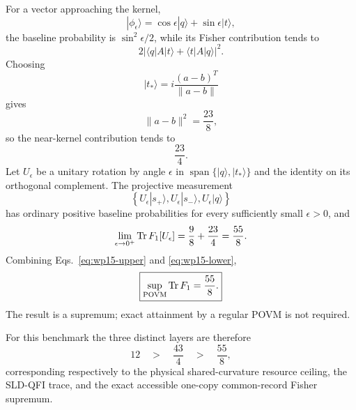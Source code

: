 For a vector approaching the kernel,
\begin{equation}
|\phi_\epsilon\rangle
=\cos\epsilon|q\rangle+\sin\epsilon|t\rangle,
\end{equation}
the baseline probability is $\sin^2\epsilon/2$, while its Fisher contribution tends to
\begin{equation}
2|\langle q|A|t\rangle+\langle t|A|q\rangle|^2.
\end{equation}
Choosing
\begin{equation}
|t_*\rangle=i\frac{(a-b)^T}{\|a-b\|}
\end{equation}
gives
\begin{equation}
\|a-b\|^2=\frac{23}{8},
\end{equation}
so the near-kernel contribution tends to
\begin{equation}
\frac{23}{4}.
\end{equation}
Let $U_\epsilon$ be a unitary rotation by angle $\epsilon$ in $\operatorname{span}\{|q\rangle,|t_*\rangle\}$ and the identity on its orthogonal complement. The projective measurement
\begin{equation}
\left\{
U_\epsilon|s_+\rangle,
U_\epsilon|s_-\rangle,
U_\epsilon|q\rangle
\right\}
\end{equation}
has ordinary positive baseline probabilities for every sufficiently small $\epsilon>0$, and
\begin{equation}
\lim_{\epsilon\to0^+}\operatorname{Tr} F_1[U_\epsilon]
=\frac98+\frac{23}{4}
=\frac{55}{8}.
\label{eq:wp15-lower}
\end{equation}
Combining Eqs.~\eqref{eq:wp15-upper} and \eqref{eq:wp15-lower},
\begin{equation}
\boxed{
\sup_{\mathrm{POVM}}\operatorname{Tr} F_1=\frac{55}{8}.
}
\end{equation}
The result is a supremum; exact attainment by a regular POVM is not required.

For this benchmark the three distinct layers are therefore
\begin{equation}
12\quad>\quad\frac{43}{4}\quad>\quad\frac{55}{8},
\end{equation}
corresponding respectively to the physical shared-curvature resource ceiling, the SLD-QFI trace, and the exact accessible one-copy common-record Fisher supremum.
